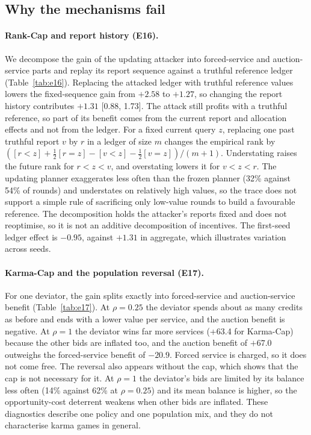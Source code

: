 \documentclass{article}
\theoremstyle{plain}
\theoremstyle{definition}
\begin{document}


\subsection{Why the mechanisms fail}

\paragraph{Rank-Cap and report history (E16).}
We decompose the gain of the updating attacker into forced-service and auction-service parts and replay its report sequence against a truthful reference ledger (Table~\ref{tab:e16}).
Replacing the attacked ledger with truthful reference values lowers the fixed-sequence gain from $+2.58$ to $+1.27$, so changing the report history contributes $+1.31$ [0.88, 1.73].
The attack still profits with a truthful reference, so part of its benefit comes from the current report and allocation effects and not from the ledger.
For a fixed current query $z$, replacing one past truthful report $v$ by $r$ in a ledger of size $m$ changes the empirical rank by $([r<z]+\tfrac12[r=z]-[v<z]-\tfrac12[v=z])/(m+1)$.
Understating raises the future rank for $r<z<v$, and overstating lowers it for $v<z<r$.
The updating planner exaggerates less often than the frozen planner (32\% against 54\% of rounds) and understates on relatively high values, so the trace does not support a simple rule of sacrificing only low-value rounds to build a favourable reference.
The decomposition holds the attacker's reports fixed and does not reoptimise, so it is not an additive decomposition of incentives.
The first-seed ledger effect is $-0.95$, against $+1.31$ in aggregate, which illustrates variation across seeds.



\paragraph{Karma-Cap and the population reversal (E17).}
For one deviator, the gain splits exactly into forced-service and auction-service benefit (Table~\ref{tab:e17}).
At $\rho=0.25$ the deviator spends about as many credits as before and ends with a lower value per service, and the auction benefit is negative.
At $\rho=1$ the deviator wins far more services (+63.4 for Karma-Cap) because the other bids are inflated too, and the auction benefit of $+67.0$ outweighs the forced-service benefit of $-20.9$.
Forced service is charged, so it does not come free.
The reversal also appears without the cap, which shows that the cap is not necessary for it.
At $\rho=1$ the deviator's bids are limited by its balance less often (14\% against 62\% at $\rho=0.25$) and its mean balance is higher, so the opportunity-cost deterrent weakens when other bids are inflated.
These diagnostics describe one policy and one population mix, and they do not characterise karma games in general.
\end{document}
